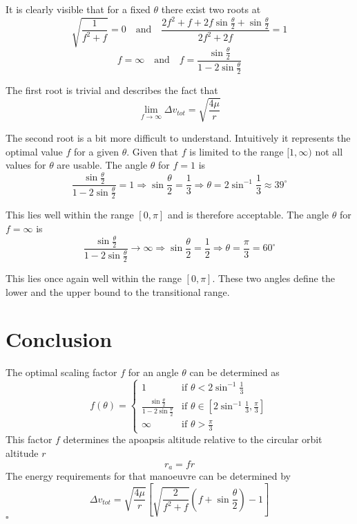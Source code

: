 \documentclass[a4paper, 11pt]{article}
\begin{document}
It is clearly visible that for a fixed $\theta$ there exist two roots at
$$\sqrt{\frac{1}{f^2+f}} = 0 \quad\text{and}\quad  \frac{2f^2+f+2f\sin\frac\theta 2 + \sin\frac\theta 2}{2f^2+2f} =1$$
$$f = \infty \quad \text{and} \quad f = \frac{\sin\frac\theta 2}{1-2\sin\frac\theta 2}$$

The first root is trivial and describes the fact that
$$\lim_{f\to\infty}\Delta v_{tot} = \sqrt{\frac{4\mu}{r}}$$

The second root is a bit more difficult to understand. Intuitively it represents the optimal value $f$ for a given $\theta$.
Given that $f$ is limited to the range $[1,\infty)$ not all values for $\theta$ are usable.
The angle $\theta$ for $f=1$ is
$$\frac{\sin\frac\theta 2}{1-2\sin\frac\theta 2} = 1 \Rightarrow \sin\frac\theta 2 = \frac13 \Rightarrow \theta = 2\sin^{-1}\frac13 \approx 39^\circ$$

This lies well within the range $[0,\pi]$ and is therefore acceptable. The angle $\theta$ for $f=\infty$ is
$$\frac{\sin\frac\theta 2}{1-2\sin\frac\theta 2} \to \infty \Rightarrow \sin\frac\theta2 = \frac12 \Rightarrow \theta = \frac\pi3=60^\circ $$

This lies once again well within the range $[0,\pi]$. These two angles define the lower and the upper bound to the transitional range.

\section{Conclusion}
The optimal scaling factor $f$ for an angle $\theta$ can be determined as
$$
f(\theta) = \begin{cases}
1 & \text{if } \theta < 2\sin^{-1}\frac13\\
\frac{\sin\frac\theta 2}{1-2\sin\frac\theta 2} & \text{if } \theta \in [2\sin^{-1}\frac13,\frac\pi3]\\
\infty & \text{if } \theta > \frac\pi3
\end{cases}$$
This factor $f$ determines the apoapsis altitude relative to the circular orbit altitude $r$
$$r_a = fr$$
The energy requirements for that manoeuvre can be determined by
$$\Delta{}v_{tot}= \sqrt{\frac{4\mu}r}\left[ \sqrt{\frac{2}{f^2 + f}} \left(f + \sin\frac{\theta}2 \right) - 1  \right]$$
\hfill $\square$
\end{document}
